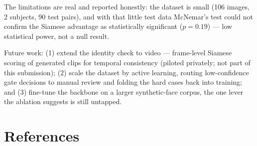 \documentclass[conference]{IEEEtran}
\begin{document}
The limitations are real and reported honestly: the dataset is small (106
images, 2 subjects, 90 test pairs), and with that little test data McNemar's test
could not confirm the Siamese advantage as statistically significant
($p = 0.19$) --- low statistical power, not a null result.

Future work: (1) extend the identity check to video --- frame-level Siamese
scoring of generated clips for temporal consistency (piloted privately; not part
of this submission); (2) scale the dataset by active learning, routing
low-confidence gate decisions to manual review and folding the hard cases back
into training; and (3) fine-tune the backbone on a larger synthetic-face corpus,
the one lever the ablation suggests is still untapped.

\section*{References}


\end{document}
